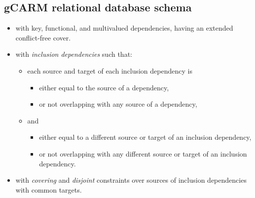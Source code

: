 \documentclass[10pt]{article}
\begin{document}
\subsection*{\textsf{gCARM} relational database schema}
\begin{itemize}
\item with key, functional, and multivalued dependencies, having an extended conflict-free cover.
\item with \textit{inclusion dependencies} such that:
\begin{itemize}
	\item each source and target of each inclusion dependency is
    \begin{itemize}
	\item either equal to the source of a dependency,
	\item or not overlapping with any source of a dependency,
    \end{itemize} 	
    \item and
	\begin{itemize}
	\item either equal to a different source or target of an inclusion dependency, 
	\item or not overlapping with any different source or target of an inclusion dependency.
    \end{itemize} 	
\end{itemize}
\item with \textit{covering} and \textit{disjoint} constraints over sources of inclusion dependencies with common targets.
\end{itemize}
\end{document}
